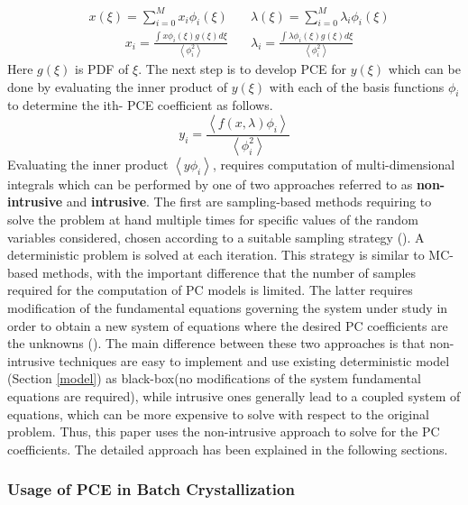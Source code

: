\documentclass[3p,times,authoryear]{elsarticle}
\begin{document}
\begin{align} \label{xandlambda}
&x(\xi) = \sum_{i=0}^{M} x_{i}\phi_{i}(\xi) 
\quad
&\lambda(\xi) = \sum_{i=0}^{M} \lambda_{i}\phi_{i}(\xi)
\end{align}
\begin{align} \label{orthogonal}
&x_{i} = \frac{\int x\phi_{i}(\xi)g(\xi) d\xi}{\left\langle \phi^{2}_{i}\right\rangle } \quad
&\lambda_{i} = \frac{\int \lambda\phi_{i}(\xi)g(\xi) d\xi}{\left\langle \phi^{2}_{i}\right\rangle }
\end{align}
Here $g(\xi)$ is PDF of $\xi$. The next step is to develop PCE for $y(\xi)$ which can be done by evaluating the inner product of $y(\xi)$ with each of the basis functions $\phi_{i}$ to determine the ith- PCE coefficient as follows.
\begin{equation}
y_{i} = \frac{\left\langle f(x,\lambda)\phi_{i} \right\rangle }{\left\langle \phi^{2}_{i} \right\rangle }
\end{equation}
Evaluating the inner product $\left\langle y\phi_{i} \right\rangle $, requires computation of multi-dimensional integrals which can be performed by one of two approaches referred to as \textbf{non-intrusive} and \textbf{intrusive}. The first are sampling-based methods requiring to
solve the problem at hand multiple times for specific values of the random variables considered,
chosen according to a suitable sampling strategy (\cite{xiu2010}). A deterministic problem is
solved at each iteration. This strategy is similar to MC-based methods, with the
important difference that the number of samples required for the computation of PC models is
limited. The latter requires modification of the fundamental equations governing the system under
study in order to obtain a new system of equations where the desired PC coefficients are the unknowns (\cite{eldred2009recent}). The main difference between these two
approaches is that non-intrusive techniques are easy to implement and use existing deterministic model (Section \ref{model}) as black-box(no modifications of the system fundamental equations are required), while intrusive ones generally lead to a coupled system of equations, which can be more expensive to solve with respect to the original problem. Thus, this paper uses the non-intrusive approach to solve for the PC coefficients. The detailed approach has been explained in the following sections.
\subsubsection{Usage of PCE in Batch Crystallization}
\end{document}
